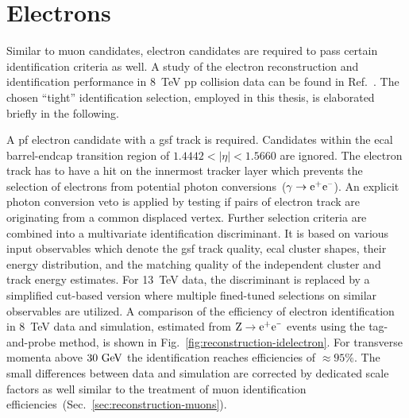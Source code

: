 


\section{Electrons}
\label{sec:reconstruction-electrons}

Similar to muon candidates, electron candidates are required to pass certain identification criteria as well. A study of the electron reconstruction and identification performance in 8~TeV pp collision data can be found in Ref.~\cite{Khachatryan:2015hwa}. The chosen ``tight'' identification selection, employed in this thesis, is elaborated briefly in the following.

A \gls{pf} electron candidate with a \gls{gsf} track is required. Candidates within the \gls{ecal} barrel-endcap transition region of $1.4442<|\eta|<1.5660$ are ignored. The electron track has to have a hit on the innermost tracker layer which prevents the selection of electrons from potential photon conversions~($\gamma\to\mathrm{e}^{\rmplus}\mathrm{e}^{\rmminus}$). An explicit photon conversion veto is applied by testing if pairs of electron track are originating from a common displaced vertex. Further selection criteria are combined into a multivariate identification discriminant. It is based on various input observables which denote the \gls{gsf} track quality, \gls{ecal} cluster shapes, their energy distribution, and the matching quality of the independent cluster and track energy estimates. For 13~TeV data, the discriminant is replaced by a simplified cut-based version where multiple fined-tuned selections on similar observables are utilized. A comparison of the efficiency of electron identification in 8~TeV data and simulation, estimated from $\mathrm{Z}\to\mathrm{e}^{\rmplus}\mathrm{e}^{\rmminus}$ events using the tag-and-probe method, is shown in Fig.~\ref{fig:reconstruction-idelectron}. For transverse momenta above $30~\mathrm{GeV}$ the identification reaches efficiencies of $\approx95\%$. The small differences between data and simulation are corrected by dedicated scale factors as well similar to the treatment of muon identification efficiencies~(Sec.~\ref{sec:reconstruction-muons}).

